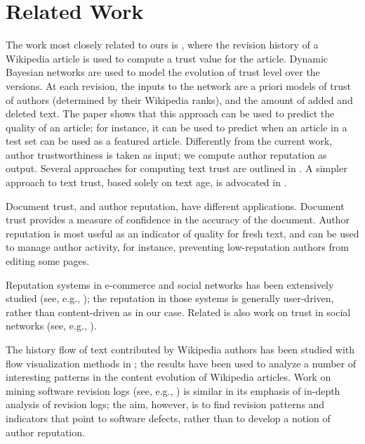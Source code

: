 \section{Related Work}

The work most closely related to ours is \cite{WikiTrust06}, where the
revision history of a Wikipedia article is used to compute a trust
value for the article.
Dynamic Bayesian networks are used to model the
evolution of trust level over the versions. 
At each revision, the inputs to the network are a priori models of
trust of authors (determined by their Wikipedia ranks), 
and the amount of added and deleted text. 
The paper shows that this approach can be used to predict the quality
of an article; for instance, it can be used to predict when an article
in a test set can be used as a featured article.  
Differently from the current work, author trustworthiness is
taken as input; we compute author reputation as output. 
Several approaches for computing text trust are outlined in
\cite{WikiMTWtrust06}. 
A simpler approach to text trust, based solely on text age, is
advocated in \cite{Cr06}. 

Document trust, and author reputation, have different applications. 
Document trust provides a measure of confidence in the accuracy of the
document. 
Author reputation is most useful as an indicator of quality
for fresh text, and can be used to manage author activity, for
instance, preventing low-reputation authors from editing some pages. 

Reputation systems in e-commerce and social networks has been extensively
studied (see, e.g., \cite{Kleinberg99,ResnickZFK00,Dellarocas03,Kamvar03});
the reputation in those systems is generally user-driven, rather than
content-driven as in our case. 
Related is also work on trust in social networks (see, e.g.,
\cite{Guha04,Golbeck05}). 

The history flow of text contributed by Wikipedia authors has
been studied with flow visualization methods in \cite{Viegas04}; 
the results have been used to analyze a number of interesting patterns
in the content evolution of Wikipedia articles. 
Work on mining software revision logs (see, e.g., \cite{Livshits05})
is similar in its emphasis of in-depth analysis of revision logs; the
aim, however, is to find revision patterns and indicators that point
to software defects, rather than to develop a notion of author
reputation. 

